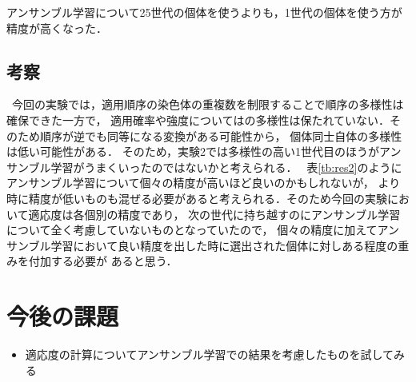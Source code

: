 \documentclass[twocolumn]{jarticle}     %
\begin{document}
\begin{table}[h]
	\centering
	\caption{25世代\label{tb:res3}}
\end{table}

アンサンブル学習について25世代の個体を使うよりも，1世代の個体を使う方が精度が高くなった．


\subsection{考察}
\ 今回の実験では，適用順序の染色体の重複数を制限することで順序の多様性は確保できた一方で，
適用確率や強度についてはの多様性は保たれていない．そのため順序が逆でも同等になる変換がある可能性から，
個体同士自体の多様性は低い可能性がある．
そのため，実験2では多様性の高い1世代目のほうがアンサンブル学習がうまくいったのではないかと考えられる．
\ 表\ref{tb:res2}のようにアンサンブル学習について個々の精度が高いほど良いのかもしれないが，
より時に精度が低いものも混ぜる必要があると考えられる．そのため今回の実験において適応度は各個別の精度であり，
次の世代に持ち越すのにアンサンブル学習について全く考慮していないものとなっていたので，
個々の精度に加えてアンサンブル学習において良い精度を出した時に選出された個体に対しある程度の重みを付加する必要が
あると思う．

\section{今後の課題}
\begin{itemize}
	\item 適応度の計算についてアンサンブル学習での結果を考慮したものを試してみる
\end{itemize}
\end{document}

